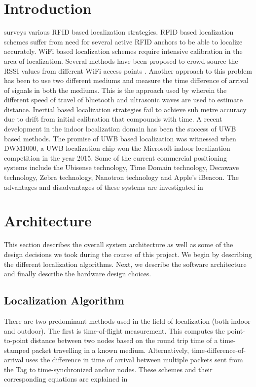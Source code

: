 \documentclass[journal,transmag]{IEEEtran}
\begin{document}
\section{Introduction}

\cite{bouet2008rfid} surveys various RFID based localization strategies. RFID based localization schemes suffer from need for several active RFID anchors to be able to localize accurately. WiFi based localization schemes require intensive calibration in the area of localization. Several methods have been proposed to crowd-source the RSSI values from different WiFi access points \cite{yang2012locating}. Another approach to this problem has been to use two different mediums and measure the time difference of arrival of signals in both the mediums. This is the approach used by \cite{alps} wherein the different speed of travel of bluetooth and ultrasonic waves are used to estimate distance. Inertial based localization strategies \cite{li2012reliable} fail to achieve sub metre accuracy due to drift from initial calibration that compounds with time. A recent development in the indoor localization domain has been the success of UWB based methods\cite{uwb}. The promise of UWB based localization was witnessed when DWM1000, a UWB localization chip won the Microsoft indoor localization competition in the year 2015. Some of the current commercial positioning systems include the Ubisense technology, Time Domain technology, Decawave technology, Zebra technology, Nanotron technology and Apple's iBeacon. The advantages and disadvantages of these systems are investigated in \cite{yavari2014ultra}

\section{Architecture}
This section describes the overall system architecture as well as some of the design decisions we took during the course of this project.  We begin by describing the different localization algorithms.  Next, we describe the software architecture and finally describe the hardware design choices.   
\subsection{Localization Algorithm}
There are two predominant methods used in the field of localization (both indoor and outdoor).  The first is time-of-flight measurement. This computes the point-to-point distance between two nodes based on the round trip time of a time-stamped packet travelling in a known medium. Alternatively, time-difference-of-arrival uses the difference in time of arrival between multiple packets sent from the Tag to time-synchronized anchor nodes. These schemes and their corresponding equations are explained in \cite{gaffney2008considerations}
\end{document}
